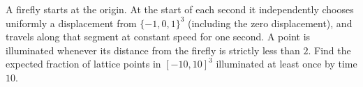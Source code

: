 A firefly starts at the origin. At the start of each second it independently chooses uniformly a displacement from $\{-1,0,1\}^3$ (including the zero displacement), and travels along that segment at constant speed for one second. A point is illuminated whenever its distance from the firefly is strictly less than $2$. Find the expected fraction of lattice points in $[-10,10]^3$ illuminated at least once by time $10$.
